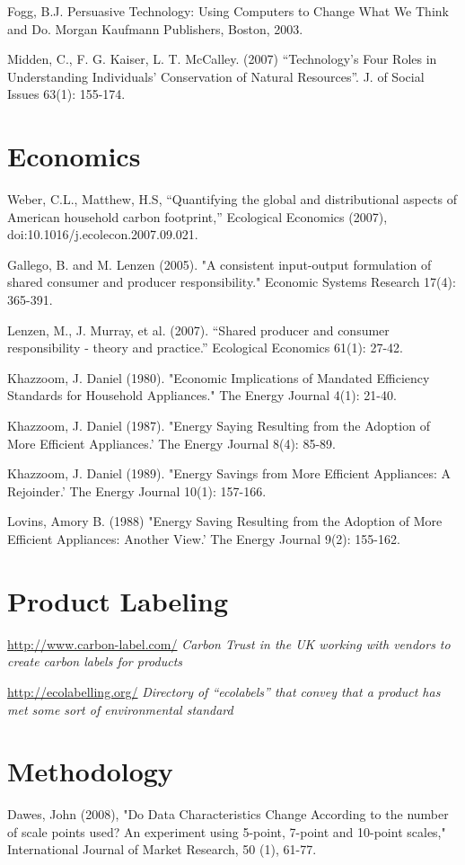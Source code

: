 Fogg, B.J.  Persuasive Technology: Using Computers to Change What We Think and Do.  Morgan Kaufmann Publishers, Boston, 2003.

Midden, C., F. G. Kaiser, L. T. McCalley. (2007) “Technology’s Four Roles in Understanding Individuals’ Conservation of Natural Resources”. J. of Social Issues 63(1): 155-174.


\section{Economics}
Weber, C.L., Matthew, H.S, “Quantifying the global and distributional 
aspects of American household carbon footprint,” Ecological Economics 
(2007), doi:10.1016/j.ecolecon.2007.09.021. 

Gallego, B. and M. Lenzen (2005). "A consistent input-output formulation of shared consumer and producer responsibility." Economic Systems Research 17(4): 
365-391.

Lenzen, M., J. Murray, et al. (2007). ``Shared producer and consumer responsibility - theory and practice.'' Ecological Economics 61(1): 27-42.

Khazzoom, J. Daniel (1980). "Economic Implications of Mandated Efficiency Standards for Household Appliances." The Energy Journal 4(1): 21-40.

Khazzoom, J. Daniel (1987). "Energy Saying Resulting from the Adoption of More Efficient Appliances.' The Energy Journal 8(4): 85-89.

Khazzoom, J. Daniel (1989). "Energy Savings from More Efficient Appliances: A Rejoinder.' The Energy Journal 10(1): 157-166.

Lovins, Amory B. (1988) "Energy Saving Resulting from the Adoption of More Efficient Appliances: Another View.' The Energy Journal 9(2): 155-162.


\section{Product Labeling}

\url{http://www.carbon-label.com/} \emph{Carbon Trust in the UK working with vendors to create carbon labels for products}

\url{http://ecolabelling.org/} \emph{Directory of ``ecolabels'' that convey that a product has met some sort of environmental standard}

\section{Methodology}
Dawes, John (2008), "Do Data Characteristics Change According to the number of scale points used? An experiment using 5-point, 7-point and 10-point scales," International Journal of Market Research, 50 (1), 61-77.